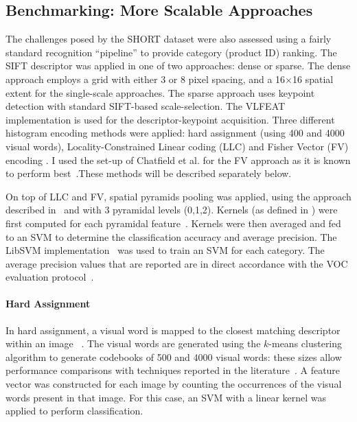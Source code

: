 


\subsection{Benchmarking: More Scalable Approaches}
\label{sec:bof}

The challenges posed by the SHORT dataset were also assessed using a fairly standard recognition ``pipeline'' to provide category (product ID) ranking. The SIFT descriptor was applied in one of two approaches: dense or sparse. The dense approach employs a grid with either 3 or 8 pixel spacing, and a 16$\times$16 spatial extent for the single-scale approaches. The sparse approach uses keypoint detection with standard SIFT-based scale-selection. The VLFEAT implementation is used for the descriptor-keypoint acquisition. Three different histogram encoding methods were applied: hard assignment \cite{Csurka2004} (using 400 and 4000 visual words), Locality-Constrained Linear coding (LLC) \cite{Wang2010} and Fisher Vector (FV) encoding \cite{Perronnin2010}. I used the set-up of Chatfield et al. for the FV approach as it is known to perform best~\cite{Chatfield2011}.These methods will be described separately below. 

On top of LLC and FV, spatial pyramids pooling was applied, using the approach described in~\cite{Lazebnik2006} and with 3 pyramidal levels (0,1,2). Kernels (as defined in \cite{Vedaldi2010}) were first computed for each pyramidal feature~\cite{VanDeSande2010}. Kernels were then averaged and fed to an SVM to determine the classification accuracy and average precision. The LibSVM implementation~\cite{CC01a} was used to train an SVM for each category. The average precision values that are reported are in direct accordance with the VOC evaluation protocol~\cite{Everingham2009}. 

\paragraph{Hard Assignment} 
In hard assignment, a visual word is mapped to the closest matching descriptor within an image ~\cite{Csurka2004}. The visual words are generated using the $k$-means clustering algorithm to generate codebooks of 500 and 4000 visual words: these sizes allow performance comparisons with techniques reported in the literature~\cite{chatfield2011devil}. A feature vector was constructed for each image by counting the occurrences of the visual words present in that image. For this case, an SVM with a linear kernel was applied to perform classification. 

